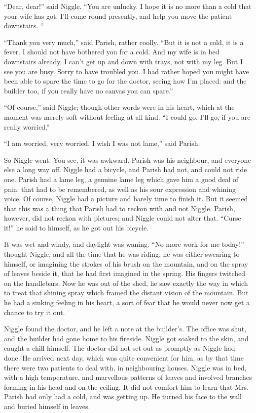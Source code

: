 \documentclass[english]{scrartcl}
\begin{document}
“Dear, dear!” said Niggle. “You are unlucky. I hope it is no more than a cold that your wife has got. I’ll come round presently, and help you move the patient downstairs. “

“Thank you very much,” said Parish, rather coolly. “But it is not a cold, it is a fever. I should not have bothered you for a cold. And my wife is in bed downstairs already. I can’t get up and down with trays, not with my leg. But I see you are busy. Sorry to have troubled you. I had rather hoped you might have been able to spare the time to go for the doctor, seeing how I’m placed: and the builder too, if you really have no canvas you can spare.”

“Of course,” said Niggle; though other words were in his heart, which at the moment was merely soft without feeling at all kind. “I could go. I’ll go, if you are really worried.”

“I am worried, very worried. I wish I was not lame,” said Parish.

So Niggle went. You see, it was awkward. Parish was his neighbour, and everyone else a long way off. Niggle had a bicycle, and Parish had not, and could not ride one. Parish had a lame leg, a genuine lame leg which gave him a good deal of pain: that had to be remembered, as well as his sour expression and whining voice. Of course, Niggle had a picture and barely time to finish it. But it seemed that this was a thing that Parish had to reckon with and not Niggle. Parish, however, did not reckon with pictures; and Niggle could not alter that. “Curse it!” he said to himself, as he got out his bicycle.

It was wet and windy, and daylight was waning. “No more work for me today!” thought Niggle, and all the time that he was riding, he was either swearing to himself, or imagining the strokes of his brush on the mountain, and on the spray of leaves beside it, that he had first imagined in the spring. His fingers twitched on the handlebars. Now he was out of the shed, he saw exactly the way in which to treat that shining spray which framed the distant vision of the mountain. But he had a sinking feeling in his heart, a sort of fear that he would never now get a chance to try it out.

Niggle found the doctor, and he left a note at the builder’s. The office was shut, and the builder had gone home to his fireside. Niggle got soaked to the skin, and caught a chill himself. The doctor did not set out as promptly as Niggle had done. He arrived next day, which was quite convenient for him, as by that time there were two patients to deal with, in neighbouring houses. Niggle was in bed, with a high temperature, and marvellous patterns of leaves and involved branches forming in his head and on the ceiling. It did not comfort him to learn that Mrs. Parish had only had a cold, and was getting up. He turned his face to the wall and buried himself in leaves.
\end{document}
